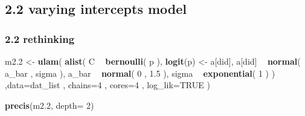 \documentclass[
]{article}
\newenvironment{Shaded}{\begin{snugshade}}{\end{snugshade}}
\newcommand{\DataTypeTok}[1]{\textcolor[rgb]{0.13,0.29,0.53}{#1}}
\newcommand{\DecValTok}[1]{\textcolor[rgb]{0.00,0.00,0.81}{#1}}
\newcommand{\FloatTok}[1]{\textcolor[rgb]{0.00,0.00,0.81}{#1}}
\newcommand{\KeywordTok}[1]{\textcolor[rgb]{0.13,0.29,0.53}{\textbf{#1}}}
\newcommand{\NormalTok}[1]{#1}
\newcommand{\OperatorTok}[1]{\textcolor[rgb]{0.81,0.36,0.00}{\textbf{#1}}}
\newcommand{\OtherTok}[1]{\textcolor[rgb]{0.56,0.35,0.01}{#1}}
\newcommand{\StringTok}[1]{\textcolor[rgb]{0.31,0.60,0.02}{#1}}
\begin{document}
\hypertarget{varying-intercepts-model-1}{%
\subsection{2.2 varying intercepts
model}\label{varying-intercepts-model-1}}

\hypertarget{rethinking-6}{%
\subsubsection{2.2 rethinking}\label{rethinking-6}}

\begin{Shaded}
\begin{Highlighting}[]
\NormalTok{m2}\FloatTok{.2}\NormalTok{ <-}\StringTok{ }\KeywordTok{ulam}\NormalTok{( }\KeywordTok{alist}\NormalTok{(}
\NormalTok{C }\OperatorTok{~}\StringTok{ }\KeywordTok{bernoulli}\NormalTok{( p ),}
\KeywordTok{logit}\NormalTok{(p) <-}\StringTok{ }\NormalTok{a[did],}
\NormalTok{a[did] }\OperatorTok{~}\StringTok{ }\KeywordTok{normal}\NormalTok{( a_bar , sigma ),}
\NormalTok{a_bar }\OperatorTok{~}\StringTok{ }\KeywordTok{normal}\NormalTok{( }\DecValTok{0}\NormalTok{ , }\FloatTok{1.5}\NormalTok{ ),}
\NormalTok{sigma }\OperatorTok{~}\StringTok{ }\KeywordTok{exponential}\NormalTok{( }\DecValTok{1}\NormalTok{ )}
\NormalTok{) ,}\DataTypeTok{data=}\NormalTok{dat_list , }\DataTypeTok{chains=}\DecValTok{4}\NormalTok{ , }\DataTypeTok{cores=}\DecValTok{4}\NormalTok{ , }\DataTypeTok{log_lik=}\OtherTok{TRUE}\NormalTok{ )}

\KeywordTok{precis}\NormalTok{(m2}\FloatTok{.2}\NormalTok{, }\DataTypeTok{depth=} \DecValTok{2}\NormalTok{)}
\end{Highlighting}
\end{Shaded}
\end{document}
